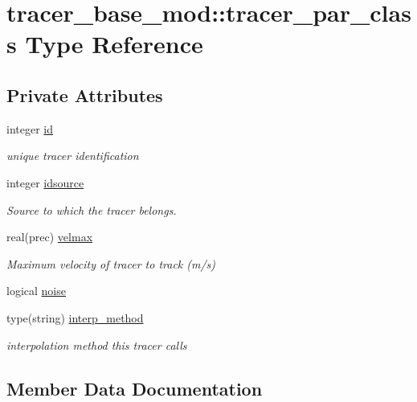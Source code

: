 \hypertarget{structtracer__base__mod_1_1tracer__par__class}{}\section{tracer\+\_\+base\+\_\+mod\+:\+:tracer\+\_\+par\+\_\+class Type Reference}
\label{structtracer__base__mod_1_1tracer__par__class}
\subsection*{Private Attributes}
\begin{DoxyCompactItemize}
\item 
integer \hyperlink{structtracer__base__mod_1_1tracer__par__class_a659d37298b1c0a06c7627e33085eaf77}{id}
\begin{DoxyCompactList}\small\item\em unique tracer identification \end{DoxyCompactList}\item 
integer \hyperlink{structtracer__base__mod_1_1tracer__par__class_ad8fa9b92761b2a1f833d77c48adbb2b3}{idsource}
\begin{DoxyCompactList}\small\item\em Source to which the tracer belongs. \end{DoxyCompactList}\item 
real(prec) \hyperlink{structtracer__base__mod_1_1tracer__par__class_a58ad740d66f1c65d200ad7bd22fbcb77}{velmax}
\begin{DoxyCompactList}\small\item\em Maximum velocity of tracer to track (m/s) \end{DoxyCompactList}\item 
logical \hyperlink{structtracer__base__mod_1_1tracer__par__class_ae331d822841461c650cb0f3ebdf511b3}{noise}
\item 
type(string) \hyperlink{structtracer__base__mod_1_1tracer__par__class_a95251de762dbf5b8e29235c3d61a6e0e}{interp\+\_\+method}
\begin{DoxyCompactList}\small\item\em interpolation method this tracer calls \end{DoxyCompactList}\end{DoxyCompactItemize}


\subsection{Member Data Documentation}
\mbox{\label{structtracer__base__mod_1_1tracer__par__class_a659d37298b1c0a06c7627e33085eaf77}} 
